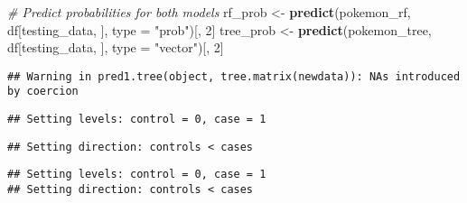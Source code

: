 \documentclass[
]{article}
\newenvironment{Shaded}{\begin{snugshade}}{\end{snugshade}}
\newcommand{\AttributeTok}[1]{\textcolor[rgb]{0.13,0.29,0.53}{#1}}
\newcommand{\CommentTok}[1]{\textcolor[rgb]{0.56,0.35,0.01}{\textit{#1}}}
\newcommand{\DecValTok}[1]{\textcolor[rgb]{0.00,0.00,0.81}{#1}}
\newcommand{\FunctionTok}[1]{\textcolor[rgb]{0.13,0.29,0.53}{\textbf{#1}}}
\newcommand{\NormalTok}[1]{#1}
\newcommand{\OtherTok}[1]{\textcolor[rgb]{0.56,0.35,0.01}{#1}}
\newcommand{\SpecialCharTok}[1]{\textcolor[rgb]{0.81,0.36,0.00}{\textbf{#1}}}
\newcommand{\StringTok}[1]{\textcolor[rgb]{0.31,0.60,0.02}{#1}}
\begin{document}
\begin{Shaded}
\begin{Highlighting}[]
\CommentTok{\# Predict probabilities for both models}
\NormalTok{rf\_prob }\OtherTok{\textless{}{-}} \FunctionTok{predict}\NormalTok{(pokemon\_rf, df[testing\_data, ], }\AttributeTok{type =} \StringTok{"prob"}\NormalTok{)[, }\DecValTok{2}\NormalTok{]}
\NormalTok{tree\_prob }\OtherTok{\textless{}{-}} \FunctionTok{predict}\NormalTok{(pokemon\_tree, df[testing\_data, ], }\AttributeTok{type =} \StringTok{"vector"}\NormalTok{)[, }\DecValTok{2}\NormalTok{]}
\end{Highlighting}
\end{Shaded}

\begin{verbatim}
## Warning in pred1.tree(object, tree.matrix(newdata)): NAs introduced by coercion
\end{verbatim}

\begin{Shaded}
\end{Shaded}

\begin{verbatim}
## Setting levels: control = 0, case = 1
\end{verbatim}

\begin{verbatim}
## Setting direction: controls < cases
\end{verbatim}

\begin{Shaded}
\end{Shaded}

\begin{verbatim}
## Setting levels: control = 0, case = 1
## Setting direction: controls < cases
\end{verbatim}
\end{document}
